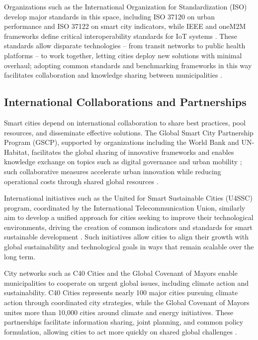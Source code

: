 \documentclass[journal]{IEEEtran}
\begin{document}
Organizations such as the International Organization for Standardization (ISO) develop major standards in this space, including ISO 37120 on urban performance and ISO 37122 on smart city indicators, while IEEE and oneM2M frameworks define critical interoperability standards for IoT systems \cite{r82}. These standards allow disparate technologies -- from transit networks to public health platforms -- to work together, letting cities deploy new solutions with minimal overhaul; adopting common standards and benchmarking frameworks in this way facilitates collaboration and knowledge sharing between municipalities \cite{r83}.

\subsection{International Collaborations and Partnerships}
Smart cities depend on international collaboration to share best practices, pool resources, and disseminate effective solutions. The Global Smart City Partnership Program (GSCP), supported by organizations including the World Bank and UN-Habitat, facilitates the global sharing of innovative frameworks and enables knowledge exchange on topics such as digital governance and urban mobility \cite{r94}; such collaborative measures accelerate urban innovation while reducing operational costs through shared global resources \cite{r86}.

International initiatives such as the United for Smart Sustainable Cities (U4SSC) program, coordinated by the International Telecommunication Union, similarly aim to develop a unified approach for cities seeking to improve their technological environments, driving the creation of common indicators and standards for smart sustainable development \cite{r83,r85}. Such initiatives allow cities to align their growth with global sustainability and technological goals in ways that remain scalable over the long term.

City networks such as C40 Cities and the Global Covenant of Mayors enable municipalities to cooperate on urgent global issues, including climate action and sustainability. C40 Cities represents nearly 100 major cities pursuing climate action through coordinated city strategies, while the Global Covenant of Mayors unites more than 10,000 cities around climate and energy initiatives. These partnerships facilitate information sharing, joint planning, and common policy formulation, allowing cities to act more quickly on shared global challenges \cite{r86,r109}.
\end{document}
